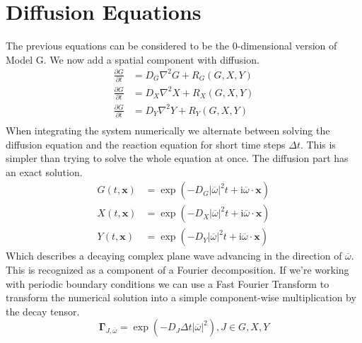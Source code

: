\documentclass{article}
\begin{document}
\section{Diffusion Equations}
The previous equations can be considered to be the 0-dimensional version of Model G. We now add a spatial component with diffusion.
\begin{align*}
\frac{\partial G}{\partial t} &= D_G \nabla^2 G + R_G(G, X, Y) \\
\frac{\partial G}{\partial t} &= D_X \nabla^2 X + R_X(G, X, Y) \\
\frac{\partial G}{\partial t} &= D_Y \nabla^2 Y + R_Y(G, X, Y) \\
\end{align*}
When integrating the system numerically we alternate between solving the diffusion equation and the reaction equation for short time steps $\Delta t$. This is simpler than trying to solve the whole equation at once. The diffusion part has an exact solution.
\begin{align}
G(t, \mathbf{x}) &= \exp(-D_G |\overline{\omega}|^2 t + \mathrm i \overline{\omega} \cdot \mathbf{x}) \label{eq:diffusion_exact} \\
X(t, \mathbf{x}) &= \exp(-D_X |\overline{\omega}|^2 t + \mathrm i \overline{\omega} \cdot \mathbf{x}) \\
Y(t, \mathbf{x}) &= \exp(-D_Y |\overline{\omega}|^2 t + \mathrm i \overline{\omega} \cdot \mathbf{x})
\end{align}
Which describes a decaying complex plane wave advancing in the direction of $\overline{\omega}$. This is recognized as a component of a Fourier decomposition. If we're working with periodic boundary conditions we can use a Fast Fourier Transform to transform the numerical solution into a simple component-wise multiplication by the decay tensor.
\begin{equation}
\mathbf \Gamma_{J,\overline{\omega}} = \exp \left (-D_J \Delta t |\overline{\omega}|^2 \right), J \in {G, X, Y}
\end{equation}
\end{document}
